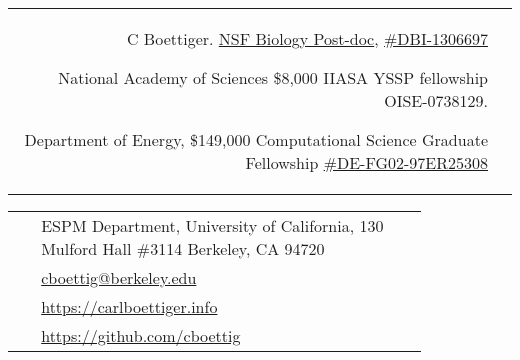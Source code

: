 \documentclass[10pt]{article} %
\begin{document}
\begin{paracol}{2}
\begin{supertabular}{rl}
  {C Boettiger. \href{http://www.nsf.gov/pubs/2012/nsf12497/nsf12497.htm}{NSF Biology
  Post-doc}, \href{http://www.nsf.gov/awardsearch/showAward?AWD_ID=1306697}{\#DBI-1306697}}

  {National Academy of Sciences \$8,000}
  {}
  {IIASA YSSP fellowship}
  {OISE-0738129}.

  {Department of Energy, \$149,000}
  {}
  {Computational Science Graduate Fellowship}
  {\href{https://www.krellinst.org/csgf/alumni/profile?n=boettiger2008}{\#DE-FG02-97ER25308}}



\end{supertabular}


\switchcolumn %


\parbox[top][0.12\textheight][c]{\linewidth}{ %
	\vspace{-0.04\textheight} %
	\colorbox{shade}{ %
		\begin{supertabular}{p{0.05\linewidth}|p{0.775\linewidth}} %
			\raisebox{-1pt}{\faHome} & ESPM Department, University of California, 130 Mulford Hall \#3114 Berkeley, CA 94720 \\ %
			\raisebox{0pt}{\small\faEnvelope} & \href{mailto:cboettig@berkeley.eu}{cboettig@berkeley.edu} \\ %
			\raisebox{-1pt}{\small\faDesktop} & \href{https://carlboettiger.info}{https://carlboettiger.info} \\ %
			\raisebox{-1pt}{\faGithub} & \href{https://github.com/cboettig}{https://github.com/cboettig} \\ %
		\end{supertabular}
	}
}



\end{paracol}
\end{document}
